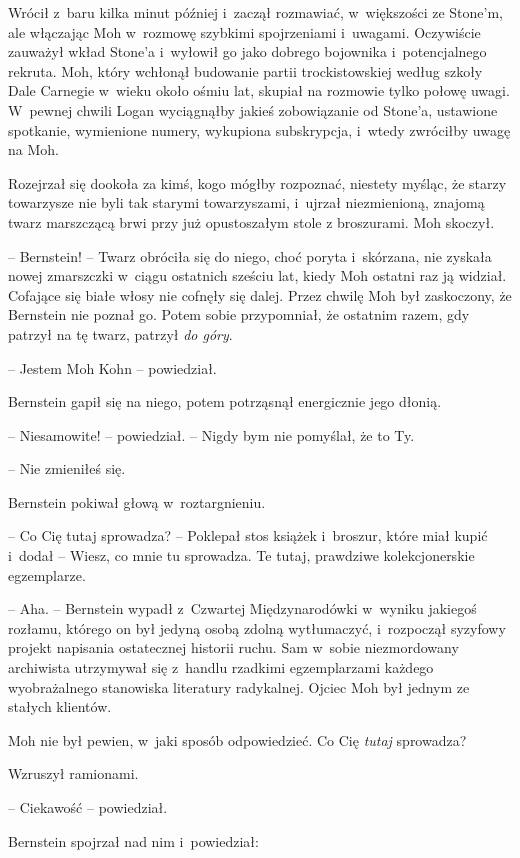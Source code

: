 \documentclass[oneside,polish,11pt,sfheadings]{mwbk}
\begin{document}
Wrócił z~baru kilka minut później i~zaczął rozmawiać, w~większości ze
Stone'm, ale włączając Moh w~rozmowę szybkimi spojrzeniami i~uwagami.
Oczywiście zauważył wkład Stone'a i~wyłowił go jako dobrego bojownika i~potencjalnego rekruta. Moh, który wchłonął budowanie partii
trockistowskiej według szkoły Dale Carnegie w~wieku około ośmiu lat,
skupiał na rozmowie tylko połowę uwagi. W~pewnej chwili Logan
wyciągnąłby jakieś zobowiązanie od Stone'a, ustawione spotkanie,
wymienione numery, wykupiona subskrypcja, i~wtedy zwróciłby uwagę na
Moh.

Rozejrzał się dookoła za kimś, kogo mógłby rozpoznać, niestety myśląc,
że starzy towarzysze nie byli tak starymi towarzyszami, i~ujrzał
niezmienioną, znajomą twarz marszczącą brwi przy już opustoszałym stole
z broszurami. Moh skoczył.

-- Bernstein! -- Twarz obróciła się do niego, choć poryta i~skórzana, nie
zyskała nowej zmarszczki w~ciągu ostatnich sześciu lat, kiedy Moh
ostatni raz ją widział. Cofające się białe włosy nie cofnęły się dalej.
Przez chwilę Moh był zaskoczony, że Bernstein nie poznał go. Potem sobie
przypomniał, że ostatnim razem, gdy patrzył na tę twarz, patrzył
\emph{do góry}.

-- Jestem Moh Kohn -- powiedział.

Bernstein gapił się na niego, potem potrząsnął energicznie jego dłonią.

-- Niesamowite! -- powiedział. -- Nigdy bym nie pomyślał, że to Ty.

-- Nie zmieniłeś się.

Bernstein pokiwał głową w~roztargnieniu. 

-- Co Cię tutaj sprowadza? -- Poklepał stos książek i~broszur, które miał kupić i~dodał -- Wiesz, co
mnie tu sprowadza. Te tutaj, prawdziwe kolekcjonerskie egzemplarze.

-- Aha. -- Bernstein wypadł z~Czwartej Międzynarodówki w~wyniku jakiegoś
rozłamu, którego on był jedyną osobą zdolną wytłumaczyć, i~rozpoczął
syzyfowy projekt napisania ostatecznej historii ruchu. Sam w~sobie
niezmordowany archiwista utrzymywał się z~handlu rzadkimi egzemplarzami
każdego wyobrażalnego stanowiska literatury radykalnej. Ojciec Moh był
jednym ze stałych klientów.

Moh nie był pewien, w~jaki sposób odpowiedzieć. Co Cię \emph{tutaj
}sprowadza?

Wzruszył ramionami. 

-- Ciekawość -- powiedział.

Bernstein spojrzał nad nim i~powiedział: 
\end{document}
